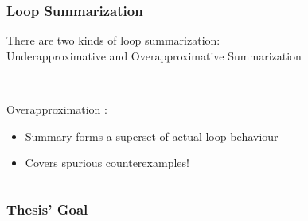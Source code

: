 \begin{frame}[t]
	\frametitle{Loop Summarization}
	\begin{center}
		There are two kinds of loop summarization: \\
		\onslide<+-> \color{emblue}Underapproximative \color{black} and \color{emblue}Overapproximative \color{black} Summarization
		\begin{columns}[t]
			\begin{column}{0.35\textwidth}
				\vspace*{0.5cm} \\
				\onslide<+-> \color{emblue} Overapproximation \color{black}:
				\begin{itemize}
					\onslide<+-> \item Summary forms a superset of actual loop behaviour
					\onslide<+-> \item Covers spurious counterexamples!
				\end{itemize}
			\end{column}
			\begin{column}{0.5\textwidth}
				\vspace*{0.5cm}
				\resizebox{\textwidth}{!}{}
			\end{column}
		\end{columns}
	\end{center}
\end{frame}

\begin{frame}[t]
	\frametitle{Thesis' Goal}
\end{frame}